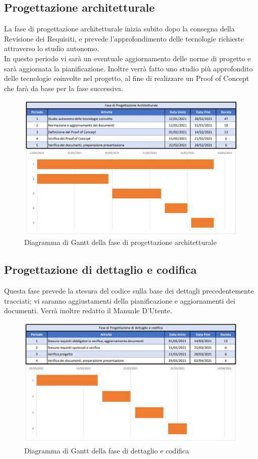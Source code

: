 \documentclass[../piano_di_progetto.tex]{subfiles}
\begin{document}
\subsection{Progettazione architetturale}%
\label{sub:prog_arc}
La fase di progettazione architetturale inizia subito dopo la consegna della Revisione dei Requisiti, e prevede l’approfondimento delle tecnologie richieste attraverso lo studio autonomo. \\
In questo periodo vi sarà un eventuale aggiornamento delle norme di progetto e sarà aggiornata la pianificazione. Inoltre verrà fatto uno studio più approfondito delle tecnologie coinvolte nel progetto, al fine di realizzare un Proof of Concept che farà da base per la fase successiva.

\begin{figure}[H]
\centering
\includegraphics[width=12cm]{fase_prog_archit}
\caption{Diagramma di Gantt della fase di progettazione architetturale}
\end{figure}


\subsection{Progettazione di dettaglio e codifica}%
\label{sub:prog_dett}
Questa fase prevede la stesura del codice sulla base dei dettagli precedentemente tracciati; vi saranno aggiustamenti della pianificazione e aggiornamenti dei documenti. Verrà inoltre redatto il Manuale D’Utente.

\begin{figure}[H]
\centering
\includegraphics[width=12cm]{fase_dett_cod}
\caption{Diagramma di Gantt della fase di dettaglio e codifica}
\end{figure}
\end{document}
